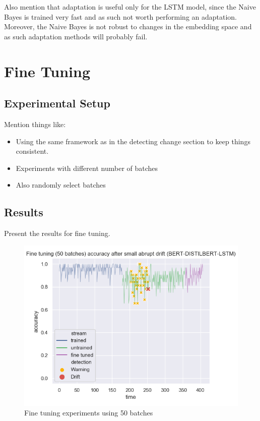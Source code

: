 \documentclass[12pt]{report}
\begin{document}
Also mention that adaptation is useful only for the LSTM model, since the Naive Bayes is trained very fast and as such not worth performing an adaptation. Moreover, the Naive Bayes is not robust to changes in the embedding space and as such adaptation methods will probably fail.

\section{Fine Tuning}

\subsection{Experimental Setup}

Mention things like:
\begin{itemize}
    \item Using the same framework as in the detecting change section to keep things consistent.
    \item Experiments with different number of batches
    \item Also randomly select batches
\end{itemize}

\subsection{Results}

Present the results for fine tuning.

\begin{figure}[ht!]
\centering
\includegraphics[width=0.8\linewidth]{assets/addressing-change/fine_tuning_lstm_wos_1_BERT_DISTILBERT_50_batches.png}
\caption{Fine tuning experiments using 50 batches}
\label{fig:fine50}
\end{figure}
\end{document}
